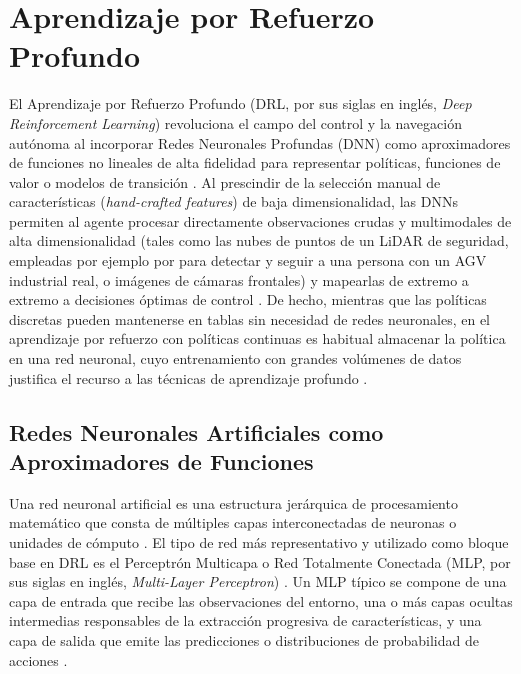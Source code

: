 \section{Aprendizaje por Refuerzo Profundo}
El Aprendizaje por Refuerzo Profundo (DRL, por sus siglas en inglés, \textit{Deep Reinforcement Learning}) revoluciona el campo del control y la navegación autónoma al incorporar Redes Neuronales Profundas (DNN) como aproximadores de funciones no lineales de alta fidelidad para representar políticas, funciones de valor o modelos de transición \citep{shakya2023reinforcement}. Al prescindir de la selección manual de características (\textit{hand-crafted features}) de baja dimensionalidad, las DNNs permiten al agente procesar directamente observaciones crudas y multimodales de alta dimensionalidad (tales como las nubes de puntos de un LiDAR de seguridad, empleadas por ejemplo por \citet{sierragarcia2023development} para detectar y seguir a una persona con un AGV industrial real, o imágenes de cámaras frontales) y mapearlas de extremo a extremo a decisiones óptimas de control \citep{hu2020deep}. De hecho, mientras que las políticas discretas pueden mantenerse en tablas sin necesidad de redes neuronales, en el aprendizaje por refuerzo con políticas continuas es habitual almacenar la política en una red neuronal, cuyo entrenamiento con grandes volúmenes de datos justifica el recurso a las técnicas de aprendizaje profundo \citep{sierragarcia2024federated}.

\subsection{Redes Neuronales Artificiales como Aproximadores de Funciones}
Una red neuronal artificial es una estructura jerárquica de procesamiento matemático que consta de múltiples capas interconectadas de neuronas o unidades de cómputo \citep{shakya2023reinforcement}. El tipo de red más representativo y utilizado como bloque base en DRL es el Perceptrón Multicapa o Red Totalmente Conectada (MLP, por sus siglas en inglés, \textit{Multi-Layer Perceptron}) \citep{ge2024deep}. Un MLP típico se compone de una capa de entrada que recibe las observaciones del entorno, una o más capas ocultas intermedias responsables de la extracción progresiva de características, y una capa de salida que emite las predicciones o distribuciones de probabilidad de acciones \citep{hu2020deep}.

